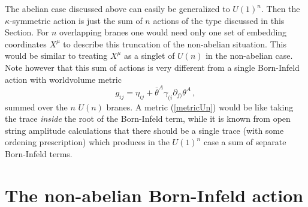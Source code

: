 \documentclass[12pt,a4paper]{article}
\begin{document}
The abelian case discussed above can easily be generalized to $U(1)^n$.
Then the $\kappa$-symmetric action is just the sum of $n$ actions
of the type discussed in this Section. For $n$ overlapping branes
one would need only one set of embedding coordinates $X^\mu$ to
describe this truncation of the non-abelian situation. This would be
similar to treating $X^\mu$ as a singlet of $U(n)$ in the non-abelian
case. Note however that this sum of actions is very different from
a single Born-Infeld action with
worldvolume metric
\begin{equation}
\label{metricUn}
   g_{ij} = \eta_{ij} + \bar\theta^A\gamma_{(i}\partial_{j)}\theta^A\,,
\end{equation}
summed over the $n$ $U(n)$ branes. A metric (\ref{metricUn}) would be
like taking the trace {\it inside} the root of the Born-Infeld term,
while it
is known from open
string amplitude calculations
that there should be a single trace (with some ordening
prescription) which produces in the $U(1)^n$ case a sum of
separate Born-Infeld terms.


\section{The non-abelian Born-Infeld action\label{YM}}
\end{document}
